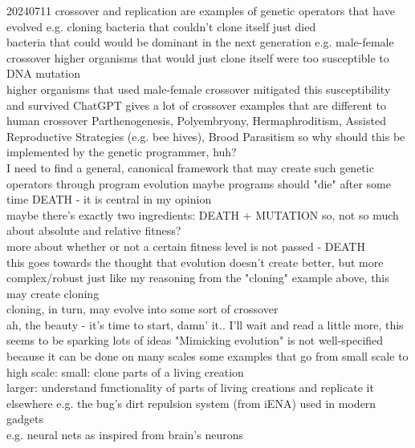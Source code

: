 \documentclass{article}\usepackage[margin=2cm]{geometry}
\begin{document}
\begin{cascade}
    20240711
    \stepin
    crossover and replication are examples of genetic operators that have evolved
    \stepin
    e.g. cloning
    \stepin
    bacteria that couldn't clone itself just died\\
    bacteria that could would be dominant in the next generation
    \stepout
    e.g. male-female crossover
    \stepin
    higher organisms that would just clone itself were too susceptible to DNA mutation\\
    higher organisms that used male-female crossover mitigated this susceptibility and survived
    \stepout
    ChatGPT gives a lot of crossover examples that are different to human crossover
    \stepin
    Parthenogenesis, Polyembryony, Hermaphroditism, Assisted Reproductive Strategies (e.g. bee hives), Brood Parasitism
    \stepout
    \stepout
    so why should this be implemented by the genetic programmer, huh?\\
    I need to find a general, canonical framework that may create such genetic operators through program evolution
    \stepin
    maybe programs should "die" after some time
    \stepin
    DEATH - it is central in my opinion\\
    maybe there's exactly two ingredients: DEATH + MUTATION
    \stepin
    so, not so much about absolute and relative fitness?\\
    more about whether or not a certain fitness level is not passed - DEATH\\
    this goes towards the thought that evolution doesn't create better, but more complex/robust
    \stepout
    \stepout
    just like my reasoning from the "cloning" example above, this may create cloning\\
    cloning, in turn, may evolve into some sort of crossover\\
    ah, the beauty - it's time to start, damn' it..
    \stepin
    I'll wait and read a little more, this seems to be sparking lots of ideas
    \stepout
    \stepout
    "Mimicking evolution" is not well-specified because it can be done on many scales
    \stepin
    some examples that go from small scale to high scale:
    \stepin
    small: clone parts of a living creation\\
    larger: understand functionality of parts of living creations and replicate it elsewhere
    \stepin
    e.g. the bug's dirt repulsion system (from iENA) used in modern gadgets\\
    e.g. neural nets as inspired from brain's neurons

\end{cascade}
\end{document}
